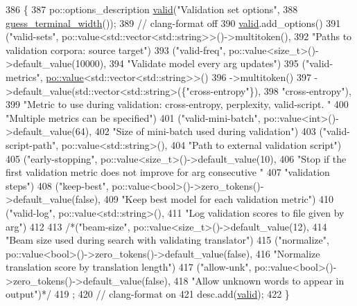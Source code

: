 \begin{DoxyCode}
386                                                               \{
387   po::options\_description \hyperlink{namespacemarian_1_1keywords_a954e890640810041c811c50d386e918a}{valid}(\textcolor{stringliteral}{"Validation set options"},
388                                 \hyperlink{namespacemarian_aa656da9ccb3e53462fef9b9745616b57}{guess\_terminal\_width}());
389   \textcolor{comment}{// clang-format off}
390   \hyperlink{namespacemarian_1_1keywords_a954e890640810041c811c50d386e918a}{valid}.add\_options()
391     (\textcolor{stringliteral}{"valid-sets"}, po::value<std::vector<std::string>>()->multitoken(),
392       \textcolor{stringliteral}{"Paths to validation corpora: source target"})
393     (\textcolor{stringliteral}{"valid-freq"}, po::value<size\_t>()->default\_value(10000),
394       \textcolor{stringliteral}{"Validate model every  arg  updates"})
395     (\textcolor{stringliteral}{"valid-metrics"}, \hyperlink{namespacemarian_1_1keywords_ac70de1b4c3cf6b7080cf5086f2963fd8}{po::value}<std::vector<std::string>>()
396       ->multitoken()
397       ->default\_value(std::vector<std::string>(\{\textcolor{stringliteral}{"cross-entropy"}\}),
398                       \textcolor{stringliteral}{"cross-entropy"}),
399       \textcolor{stringliteral}{"Metric to use during validation: cross-entropy, perplexity, valid-script. "}
400       \textcolor{stringliteral}{"Multiple metrics can be specified"})
401     (\textcolor{stringliteral}{"valid-mini-batch"}, po::value<int>()->default\_value(64),
402       \textcolor{stringliteral}{"Size of mini-batch used during validation"})
403     (\textcolor{stringliteral}{"valid-script-path"}, po::value<std::string>(),
404      \textcolor{stringliteral}{"Path to external validation script"})
405     (\textcolor{stringliteral}{"early-stopping"}, po::value<size\_t>()->default\_value(10),
406      \textcolor{stringliteral}{"Stop if the first validation metric does not improve for  arg  consecutive "}
407      \textcolor{stringliteral}{"validation steps"})
408     (\textcolor{stringliteral}{"keep-best"}, po::value<bool>()->zero\_tokens()->default\_value(\textcolor{keyword}{false}),
409       \textcolor{stringliteral}{"Keep best model for each validation metric"})
410     (\textcolor{stringliteral}{"valid-log"}, po::value<std::string>(),
411      \textcolor{stringliteral}{"Log validation scores to file given by  arg"})
412 
413     \textcolor{comment}{/*("beam-size", po::value<size\_t>()->default\_value(12),}
414 \textcolor{comment}{      "Beam size used during search with validating translator")}
415 \textcolor{comment}{    ("normalize", po::value<bool>()->zero\_tokens()->default\_value(false),}
416 \textcolor{comment}{      "Normalize translation score by translation length")}
417 \textcolor{comment}{    ("allow-unk", po::value<bool>()->zero\_tokens()->default\_value(false),}
418 \textcolor{comment}{      "Allow unknown words to appear in output")*/}
419   ;
420   \textcolor{comment}{// clang-format on}
421   desc.add(\hyperlink{namespacemarian_1_1keywords_a954e890640810041c811c50d386e918a}{valid});
422 \}
\end{DoxyCode}


